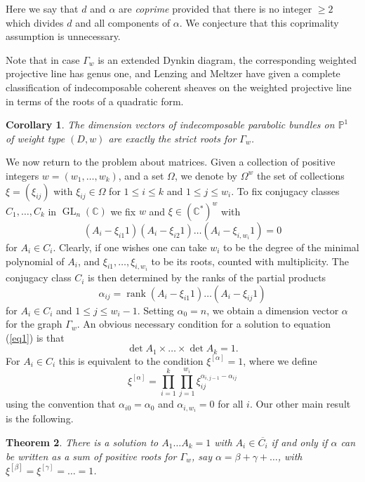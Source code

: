 \documentclass{amsart}
\theoremstyle{plain}
\newtheorem{thm}{Theorem}[section]
\newtheorem{cor}[thm]{Corollary}
\theoremstyle{definition}
\theoremstyle{remark}
\newcommand{\C}{\mathbb{C}}
\newcommand{\PP}{\mathbb{P}}
\DeclareMathOperator{\GL}{GL}
\DeclareMathOperator{\rank}{rank}
\begin{document}
Here we say that $d$ and $\alpha$ are \emph{coprime} provided that there is
no integer $\ge 2$ which divides $d$ and all components of $\alpha$.
We conjecture that this coprimality assumption is unnecessary.

Note that in case $\Gamma_w$ is an extended Dynkin diagram,
the corresponding weighted projective line has genus one,
and Lenzing and Meltzer \cite[Theorem 4.6]{LM} have given a complete classification
of indecomposable coherent sheaves on the weighted projective line
in terms of the roots of a quadratic form.


\begin{cor}
The dimension vectors of indecomposable parabolic bundles on $\PP^1$
of weight type $(D,w)$ are exactly the strict roots for $\Gamma_w$.
\end{cor}



We now return to the problem about matrices.
Given a collection of positive integers $w=(w_1,\dots,w_k)$, and a set
$\Omega$, we denote by $\Omega^w$ the set of collections $\xi = (\xi_{ij})$
with $\xi_{ij}\in \Omega$ for $1\le i \le k$ and $1\le j \le w_i$.
To fix conjugacy classes $C_1,\dots,C_k$ in $\GL_n(\C)$ we fix $w$ and
$\xi\in(\C^*)^w$ with
\[
(A_i - \xi_{i1} 1) (A_i - \xi_{i2} 1) \dots (A_i - \xi_{i,w_i} 1) = 0
\]
for $A_i\in C_i$. Clearly, if one wishes one can take $w_i$ to be the
degree of the minimal polynomial of $A_i$, and $\xi_{i1},\dots,\xi_{i,w_i}$
to be its roots, counted with multiplicity. The conjugacy class $C_i$ is
then determined by the ranks of the partial products
\[
\alpha_{ij} = \rank (A_i - \xi_{i1}1)\dots(A_i - \xi_{ij}1)
\]
for $A_i\in C_i$ and $1\le j\le w_i-1$. Setting $\alpha_0 = n$, we obtain
a dimension vector $\alpha$ for the graph $\Gamma_w$.
An obvious necessary condition for a solution to equation (\ref{eq1})
is that
\[
\det A_1 \times \dots \times \det A_k = 1.
\]
For $A_i\in C_i$ this is equivalent to the condition $\xi^{[\alpha]} = 1$,
where we define
\[
\xi^{[\alpha]} = \prod_{i=1}^k \prod_{j=1}^{w_i} \xi_{ij}^{\alpha_{i,j-1} - \alpha_{ij}}
\]
using the convention that $\alpha_{i0} = \alpha_0$ and $\alpha_{i,w_i}=0$ for all $i$.
Our other main result is the following.


\begin{thm}\label{t:clothm}
There is a solution to $A_1\dots A_k = 1$ with $A_i\in\overline{C_i}$
if and only if $\alpha$ can be written as a sum of positive roots for $\Gamma_w$,
say $\alpha = \beta+\gamma+\dots$, with $\xi^{[\beta]} = \xi^{[\gamma]} = \dots = 1$.
\end{thm}
\end{document}

